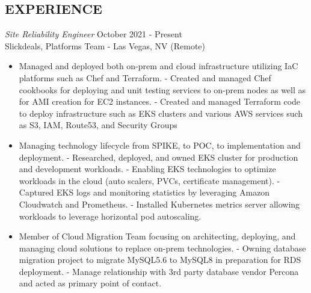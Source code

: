 \documentclass[line,margin]{res}
\begin{document}
\address{Phone: +1.650.772.1711 $|$ Email: alan.huang.250r@gmail.com}

\begin{resume}


\section{EXPERIENCE}
\vspace{25px}
\begin{adjustwidth}{-115pt}{0pt}
	{\sl Site Reliability Engineer}
		\hfill October 2021 - Present\\
		Slickdeals, Platforms Team - Las Vegas, NV (Remote)
		\begin{itemize}
			\item Managed and deployed both on-prem and cloud infrastructure utilizing IaC platforms such as Chef and Terraform.
				\subitem - Created and managed Chef cookbooks for deploying and unit testing services to on-prem nodes as well as for AMI creation for EC2 instances.
				\subitem - Created and managed Terraform code to deploy infrastructure such as EKS clusters and various AWS services such as S3, IAM, Route53, and Security Groups
			\item Managing technology lifecycle from SPIKE, to POC, to implementation and deployment.
				\subitem - Researched, deployed, and owned EKS cluster for production and development workloads.
				\subitem - Enabling EKS technologies to optimize workloads in the cloud (auto scalers, PVCs, certificate management).
				\subitem - Captured EKS logs and monitoring statistics by leveraging Amazon Cloudwatch and Prometheus.
				\subitem - Installed Kubernetes metrics server allowing workloads to leverage horizontal pod autoscaling.
			\item Member of Cloud Migration Team focusing on architecting, deploying, and managing cloud solutions to replace on-prem technologies.
				\subitem - Owning database migration project to migrate MySQL5.6 to MySQL8 in preparation for RDS deployment.
				\subitem - Manage relationship with 3rd party database vendor Percona and acted as primary point of contact.


\end{itemize}
\end{adjustwidth}
\end{resume}
\end{document}
